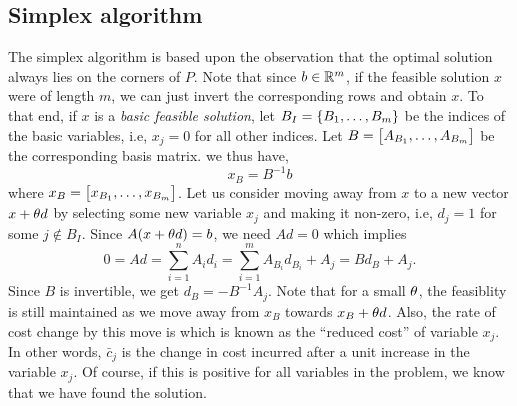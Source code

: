 \documentclass[letterpaper, 10pt, twocolumn, reqno]{amsart}
\begin{document}
\subsection{Simplex algorithm}
\label{ssec:simplex}
The simplex algorithm is based upon the observation that the optimal solution always lies on the corners of $P$. Note that since $b \in \mathbb{R}^m$, if the feasible solution $x$ were of length $m$, we can just invert the corresponding rows and obtain $x$. To that end, if $x$ is a \emph{basic feasible solution}, let $B_I = \left\{B_1, \ldots, B_m\right\}$ be the indices of the basic variables, i.e, $x_j = 0$ for all other indices. Let $B = \begin{bmatrix}A_{B_1}, \ldots, A_{B_m}\end{bmatrix}$ be the corresponding basis matrix. we thus have,
$$
x_B = B^{-1} b
$$
where $x_B = \begin{bmatrix}x_{B_1}, \ldots, x_{B_m}\end{bmatrix}$.
Let us consider moving away from $x$ to a new vector $x + \theta d$ by selecting some new variable $x_j$ and making it non-zero, i.e, $d_j = 1$ for some $j \notin B_I$. Since $A(x+\theta d) = b$, we need $A d = 0$ which implies
$$
0 = A d = \sum_{i=1}^n A_i d_i = \sum_{i=1}^m A_{B_i} d_{B_i} + A_j = B d_B + A_j.
$$
Since $B$ is invertible, we get $d_B = -B^{-1} A_j$. Note that for a small $\theta$, the feasiblity is still maintained as we move away from $x_B$ towards $x_B + \theta d$. Also, the rate of cost change by this move is
which is known as the ``reduced cost'' of variable $x_j$. In other words, $\bar{c}_j$ is the change in cost incurred after a unit increase in the variable $x_j$. Of course, if this is positive for all variables in the problem, we know that we have found the solution.

\end{document}
